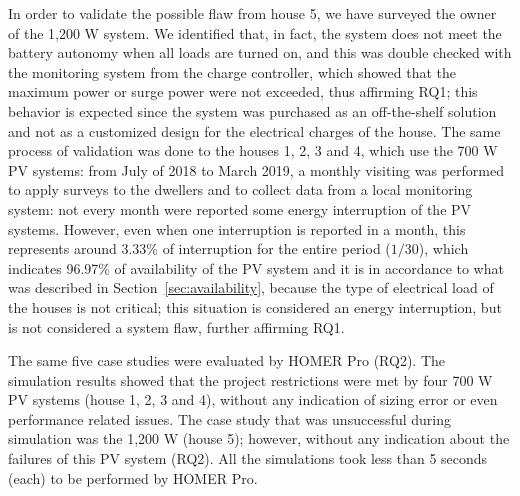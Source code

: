 \documentclass[review]{elsarticle}
\begin{document}
In order to validate the possible flaw from house 5, we have surveyed the owner of the 1,200 W system. We identified that, in fact, the system does not meet the battery autonomy when all loads are turned on, and this was double checked with the monitoring system from the charge controller, which showed that the maximum power or surge power were not exceeded, thus affirming RQ1; this behavior is expected since the system was purchased as an off-the-shelf solution and not as a customized design for the electrical charges of the house. The same process of validation was done to the houses 1, 2, 3 and 4, which use the 700 W PV systems: from July of 2018 to March 2019, a monthly visiting was performed to apply surveys to the dwellers and to collect data from a local monitoring system: not every month were reported some energy interruption of the PV systems. However, even when one interruption is reported in a month, this represents around 3.33\% of interruption for the entire period ($1/30$), which indicates 96.97\% of availability of the PV system %
and it is in accordance to what was described in Section~\ref{sec:availability}, because the type of electrical load of the houses is not critical; this situation is considered an energy interruption, but is not considered a system flaw, further affirming RQ1.

The same five case studies were evaluated by HOMER Pro (RQ2). The simulation results showed that the project restrictions were met by four 700 W PV systems (house 1, 2, 3 and 4), without any indication of sizing error or even performance related issues. The case study that was unsuccessful during simulation was the 1,200 W (house 5); however, without any indication about the failures of this PV system (RQ2). All the simulations took less than 5 seconds (each) to be performed by HOMER Pro. %
%
%
\end{document}
